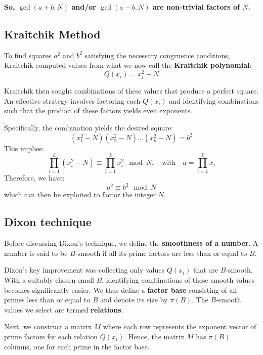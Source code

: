 \documentclass[a4paper, 11pt]{article}
\begin{document}
\textbf{So, $\gcd(a+b,N)$ and/or $\gcd(a-b,N)$ are non-trivial factors of $N$.}

\subsection{Kraitchik Method}

To find squares $a^2$ and $b^2$ satisfying the necessary congruence conditions, Kraitchik computed values from what we now call the \textbf{Kraitchik polynomial}:
\begin{equation}
Q(x_i) = x_i^2 - N
\end{equation}

Kraitchik then sought combinations of these values that produce a perfect square. An effective strategy involves factoring each $Q(x_i)$ and identifying combinations such that the product of these factors yields even exponents.

Specifically, the combination yields the desired square:
\begin{equation}
    (x_1^2 - N)(x_2^2 - N) \dots (x_k^2 - N) = b^2
\end{equation}
This implies:
\begin{equation}
    \prod_{i=1}^{k} (x_i^2 - N) \equiv \prod_{i=1}^{k} x_i^2 \mod N, \quad \text{with} \quad a = \prod_{i=1}^{k} x_i
\end{equation}
Therefore, we have:
\begin{equation}
    a^2 \equiv b^2 \mod N
\end{equation}
which can then be exploited to factor the integer $N$.

\subsection{Dixon technique}

Before discussing Dixon's technique, we define the \textbf{smoothness of a number}. A number is said to be $B$-smooth if all its prime factors are less than or equal to $B$.

Dixon's key improvement was collecting only values $Q(x_i)$ that are $B$-smooth. With a suitably chosen small $B$, identifying combinations of these smooth values becomes significantly easier. We thus define a \textbf{factor base} consisting of all primes less than or equal to $B$ and denote its size by $\pi(B)$. The $B$-smooth values we select are termed \textbf{relations}.

Next, we construct a matrix $M$ where each row represents the exponent vector of prime factors for each relation $Q(x_i)$. Hence, the matrix $M$ has $\pi(B)$ columns, one for each prime in the factor base.
\end{document}
